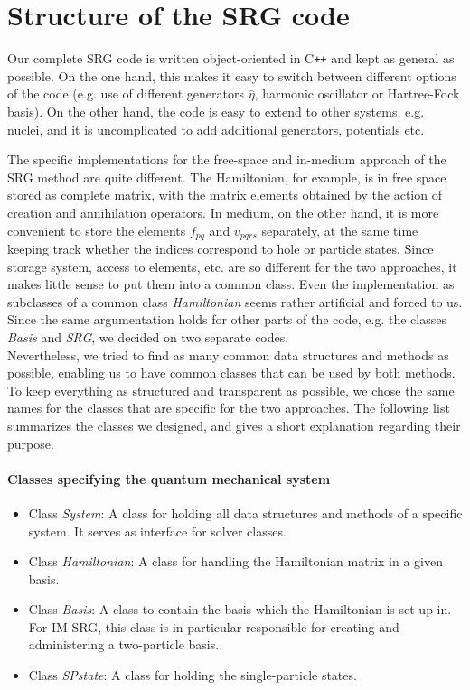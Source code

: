 \section{Structure of the SRG code}
Our complete SRG code is written object-oriented in C{}\verb!++! and kept as general as possible. On the one hand, this makes it easy to switch between different options of the code (e.g. use of different generators $\hat{\eta}$, harmonic oscillator or Hartree-Fock basis). On the other hand, the code is easy to extend to other systems, e.g. nuclei, and it is uncomplicated to add additional generators, potentials etc.

The specific implementations for the free-space and in-medium approach of the SRG method  are quite different. The Hamiltonian, for example, is in free space stored as complete matrix, with the matrix elements obtained by the action of creation and annihilation operators. In medium, on the other hand, it is more convenient to store the elements $f_{pq}$ and $v_{pqrs}$ separately, at the same time keeping track whether the indices correspond to hole or particle states. Since storage system, access to elements, etc. are so different for the two approaches, it makes little sense to put them into a common class. Even the implementation as subclasses of a common class \textit{Hamiltonian} seems rather artificial and forced to us. Since the same argumentation holds for other parts of the code, e.g. the classes \textit{Basis} and \textit{SRG}, we decided on two separate codes. \\
Nevertheless, we tried to find as many common data structures and methods as possible, enabling us to have 
common classes that can be used by both methods. 
To keep everything as structured and transparent as possible, we chose the same names for the classes that are specific for the two approaches. The following list summarizes the classes we designed, and gives a short explanation regarding their purpose.


\paragraph*{Classes specifying the quantum mechanical system}
\begin{itemize}
\item Class \textit{System}: A class for holding all data structures and methods of a specific system. It serves as interface for solver classes.
\item Class \textit{Hamiltonian}: A class for handling the Hamiltonian matrix in a given basis.
\item Class \textit{Basis}: A class to contain the basis which the Hamiltonian is set up in. For IM-SRG, this class is in particular responsible for creating and administering a two-particle basis.
\item Class \textit{SPstate}: A class for holding the single-particle states.
\end{itemize}

